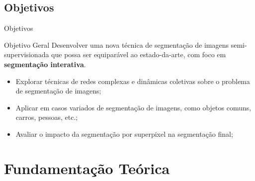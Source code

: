\documentclass{templatebeamerufc/libs/ufc_format}
\begin{document}
\subsection{Objetivos}
\begin{frame}{Objetivos}
  \begin{alertblock}{Objetivo Geral}
    Desenvolver uma nova técnica de segmentação de imagens
    semi-supervisionada que possa ser equiparável ao estado-da-arte, com
    foco em \textbf{segmentação interativa}.
  \end{alertblock}
  \pause{}
  \begin{itemize}[<+->]
  \item Explorar técnicas de redes complexas e dinâmicas coletivas sobre
    o problema de segmentação de imagens;
  \item Aplicar em casos variados de segmentação de imagens, como
    objetos comuns, carros, pessoas, etc.;
  \item Avaliar o impacto da segmentação por superpixel na segmentação final;
  \end{itemize}

\end{frame}


\section{Fundamentação Teórica}
\end{document}
